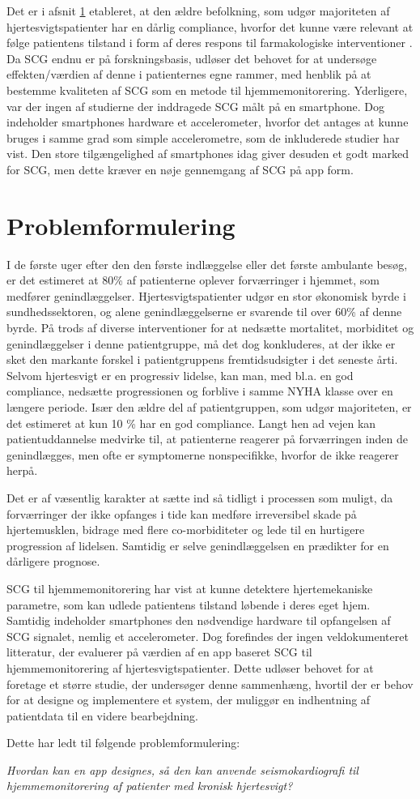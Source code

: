 Det er i afsnit \ref{} etableret, at den ældre befolkning, som udgør majoriteten af hjertesvigtspatienter har en dårlig compliance, hvorfor det kunne være relevant at følge patientens tilstand i form af deres respons til farmakologiske interventioner \citep{Inan2018}. Da SCG endnu er på forskningsbasis, udløser det behovet for at undersøge effekten/værdien af denne i patienternes egne rammer, med henblik på at bestemme kvaliteten af SCG som en metode til hjemmemonitorering.
Yderligere, var der ingen af studierne der inddragede SCG målt på en smartphone. Dog indeholder smartphones hardware et accelerometer, hvorfor det antages at kunne bruges i samme grad som simple accelerometre, som de inkluderede studier har vist. Den store tilgængelighed af smartphones idag giver desuden et godt marked for SCG, men dette kræver en nøje gennemgang af SCG på app form.

\section{Problemformulering}
I de første uger efter den den første indlæggelse eller det første ambulante besøg, er det estimeret at 80\% af patienterne oplever forværringer i hjemmet, som medfører genindlæggelser. Hjertesvigtspatienter udgør en stor økonomisk byrde i sundhedssektoren, og alene genindlæggelserne er svarende til over 60\% af denne byrde. På trods af diverse interventioner for at nedsætte mortalitet, morbiditet og genindlæggelser i denne patientgruppe, må det dog konkluderes, at der ikke er sket den markante forskel i patientgruppens fremtidsudsigter i det seneste årti. 
Selvom hjertesvigt er en progressiv lidelse, kan man, med bl.a. en god compliance, nedsætte progressionen og forblive i samme NYHA klasse over en længere periode. Især den ældre del af patientgruppen, som udgør majoriteten, er det estimeret at kun 10 \% har en god compliance. Langt hen ad vejen kan patientuddannelse medvirke til, at patienterne reagerer på forværringen inden de genindlægges, men ofte er symptomerne nonspecifikke, hvorfor de ikke reagerer herpå.

Det er af væsentlig karakter at sætte ind så tidligt i processen som muligt, da forværringer der ikke opfanges i tide kan medføre irreversibel skade på hjertemusklen, bidrage med flere co-morbiditeter og lede til en hurtigere progression af lidelsen. Samtidig er selve genindlæggelsen en prædikter for en dårligere prognose.

SCG til hjemmemonitorering har vist at kunne detektere hjertemekaniske parametre, som kan udlede patientens tilstand løbende i deres eget hjem. Samtidig indeholder smartphones den nødvendige hardware til opfangelsen af SCG signalet, nemlig et accelerometer. Dog forefindes der ingen veldokumenteret litteratur, der evaluerer på værdien af en app baseret SCG til hjemmemonitorering af hjertesvigtspatienter. Dette udløser behovet for at foretage et større studie, der undersøger denne sammenhæng, hvortil der er behov for at designe og implementere et system, der muliggør en indhentning af patientdata til en videre bearbejdning.

Dette har ledt til følgende problemformulering:


\begin{displayquote}
\textit{Hvordan kan en app designes, så den kan anvende seismokardiografi til hjemmemonitorering af patienter med kronisk hjertesvigt?}
\end{displayquote}